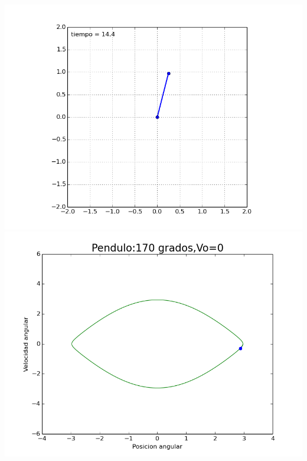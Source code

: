 \documentclass[12pt]{article}
\begin{document}
\begin{center}
\includegraphics[scale=0.5]{170.png}\\
\includegraphics[scale=0.5]{figure_170.png}
\end{center}
\end{document}
